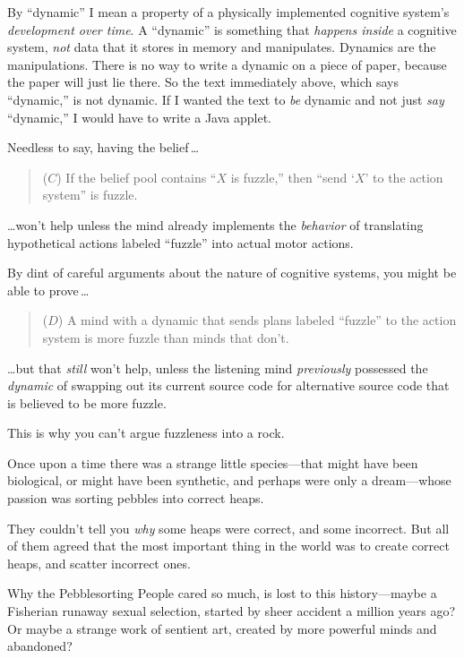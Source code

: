  By ``dynamic'' I mean a
property of a physically implemented cognitive system's
\textit{development over time}. A
``dynamic'' is something that
\textit{happens inside} a cognitive system, \textit{not} data that it
stores in memory and manipulates. Dynamics are the manipulations. There
is no way to write a dynamic on a piece of paper, because the paper
will just lie there. So the text immediately above, which says
``dynamic,'' is not dynamic. If I
wanted the text to \textit{be} dynamic and not just \textit{say}
``dynamic,'' I would have to write a
Java applet.


 Needless to say, having the belief\,\ldots

\begin{quotation}
{
 ($C$) If the belief pool contains ``$X$ is
fuzzle,'' then ``send
`$X$' to the action
system'' is fuzzle.}
\end{quotation}


 \ldots won't help unless the mind already
implements the \textit{behavior} of translating hypothetical actions
labeled ``fuzzle'' into actual motor
actions.


 By dint of careful arguments about the nature of cognitive
systems, you might be able to prove\,\ldots

\begin{quotation}
{
 ($D$) A mind with a dynamic that sends plans labeled
``fuzzle'' to the action system is
  more fuzzle than minds that don't.}
\end{quotation}


 \ldots but that \textit{still} won't help, unless
the listening mind \textit{previously} possessed the \textit{dynamic}
of swapping out its current source code for alternative source code
that is believed to be more fuzzle.


 This is why you can't argue fuzzleness into a
rock.

\myendsectiontext



 Once upon a time there was a strange little species---that might
have been biological, or might have been synthetic, and perhaps were
only a dream---whose passion was sorting pebbles into correct heaps. 


 They couldn't tell you \textit{why} some heaps
were correct, and some incorrect. But all of them agreed that the most
important thing in the world was to create correct heaps, and scatter
incorrect ones.


 Why the Pebblesorting People cared so much, is lost to this
history---maybe a Fisherian runaway sexual selection, started by sheer
accident a million years ago? Or maybe a strange work of sentient art,
created by more powerful minds and abandoned?


